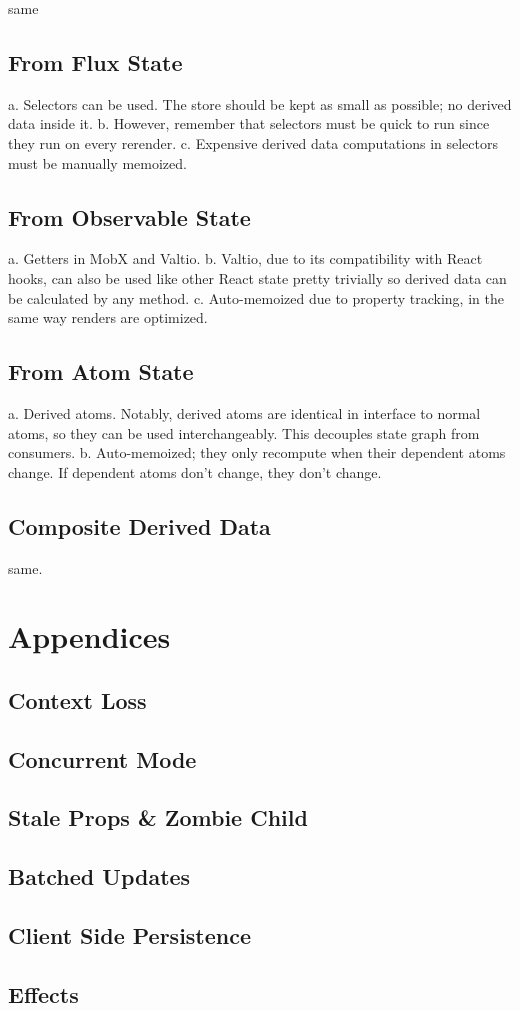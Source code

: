 \documentclass{article}
\begin{document}
same

\subsection{From Flux State}

a. Selectors can be used. The store should be kept as small as possible; no derived data inside it.
b. However, remember that selectors must be quick to run since they run on every rerender.
c. Expensive derived data computations in selectors must be manually memoized.

\subsection{From Observable State}

a. Getters in MobX and Valtio.
b. Valtio, due to its compatibility with React hooks, can also be used like other React state pretty trivially so derived data can be calculated by any method.
c. Auto-memoized due to property tracking, in the same way renders are optimized.

\subsection{From Atom State}

a. Derived atoms. Notably, derived atoms are identical in interface to normal atoms, so they can be used interchangeably. This decouples state graph from consumers.
b. Auto-memoized; they only recompute when their dependent atoms change. If dependent atoms don't change, they don't change.

\subsection{Composite Derived Data}

same.

\section{Appendices}

\subsection{Context Loss}

\subsection{Concurrent Mode}

\subsection{Stale Props \& Zombie Child}

\subsection{Batched Updates}

\subsection{Client Side Persistence}

\subsection{Effects}
\end{document}
